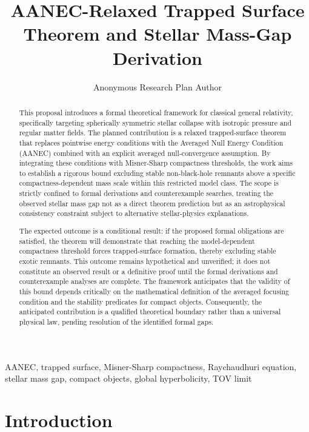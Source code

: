 \documentclass[conference]{IEEEtran}
\begin{document}
\title{AANEC-Relaxed Trapped Surface Theorem and Stellar Mass-Gap Derivation}\author{Anonymous Research Plan Author}\maketitle

\begin{abstract}
This proposal introduces a formal theoretical framework for classical general relativity, specifically targeting spherically symmetric stellar collapse with isotropic pressure and regular matter fields. The planned contribution is a relaxed trapped-surface theorem that replaces pointwise energy conditions with the Averaged Null Energy Condition (AANEC) combined with an explicit averaged null-convergence assumption. By integrating these conditions with Misner-Sharp compactness thresholds, the work aims to establish a rigorous bound excluding stable non-black-hole remnants above a specific compactness-dependent mass scale within this restricted model class. The scope is strictly confined to formal derivations and counterexample searches, treating the observed stellar mass gap not as a direct theorem prediction but as an astrophysical consistency constraint subject to alternative stellar-physics explanations.

The expected outcome is a conditional result: if the proposed formal obligations are satisfied, the theorem will demonstrate that reaching the model-dependent compactness threshold forces trapped-surface formation, thereby excluding stable exotic remnants. This outcome remains hypothetical and unverified; it does not constitute an observed result or a definitive proof until the formal derivations and counterexample analyses are complete. The framework anticipates that the validity of this bound depends critically on the mathematical definition of the averaged focusing condition and the stability predicates for compact objects. Consequently, the anticipated contribution is a qualified theoretical boundary rather than a universal physical law, pending resolution of the identified formal gaps.
\end{abstract}
\begin{IEEEkeywords}
AANEC, trapped surface, Misner-Sharp compactness, Raychaudhuri equation, stellar mass gap, compact objects, global hyperbolicity, TOV limit
\end{IEEEkeywords}\section{Introduction}
\end{document}
